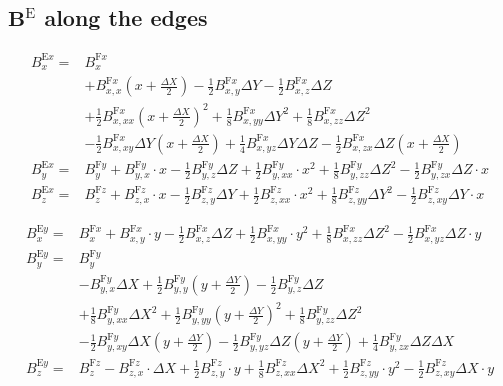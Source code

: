 \documentclass[a4paper,10pt]{article}
\newcommand{\Be}{\mathbf{B}^\mathrm{E}}
\newcommand{\Bex}{B^{\mathrm{E}x}}
\newcommand{\Bey}{B^{\mathrm{E}y}}
\newcommand{\Bfx}{B^{\mathrm{F}x}}
\newcommand{\Bfy}{B^{\mathrm{F}y}}
\newcommand{\Bfz}{B^{\mathrm{F}z}}
\newcommand{\pp}[1]{\left(#1\right)}
\newcommand{\DX}{\Delta X}
\newcommand{\DY}{\Delta Y}
\newcommand{\DZ}{\Delta Z}
\begin{document}
\subsection{$\Be$ along the edges}
\begin{align}
\Bex_x = &\Bfx_x \nonumber
\\ &+
\Bfx_{x,x}\pp{x + \frac{\DX}{2}} -
\frac{1}{2}\Bfx_{x,y}\DY -
\frac{1}{2}\Bfx_{x,z}\DZ \nonumber
\\ &+
\frac{1}{2}\Bfx_{x,xx}\pp{x+\frac{\DX}{2}}^2 +
\frac{1}{8}\Bfx_{x,yy}\DY^2 +
\frac{1}{8}\Bfx_{x,zz}\DZ^2 \nonumber
\\ &-
\frac{1}{2}\Bfx_{x,xy}\DY\pp{x + \frac{\DX}{2}} +
\frac{1}{4}\Bfx_{x,yz}\DY\DZ -
\frac{1}{2}\Bfx_{x,zx}\DZ\pp{x + \frac{\DX}{2}}
\\
\Bex_y =& \Bfy_y +
\Bfy_{y,x}\cdot x -
\frac{1}{2}\Bfy_{y,z}\DZ +
\frac{1}{2}\Bfy_{y,xx}\cdot x^2 +
\frac{1}{8}\Bfy_{y,zz}\DZ^2 -
\frac{1}{2}\Bfy_{y,zx}\DZ\cdot x
\\
\Bex_z =& \Bfz_z +
\Bfz_{z,x}\cdot x -
\frac{1}{2}\Bfz_{z,y}\DY +
\frac{1}{2}\Bfz_{z,xx}\cdot x^2 +
\frac{1}{8}\Bfz_{z,yy}\DY^2 -
\frac{1}{2}\Bfz_{z,xy}\DY\cdot x
\end{align}






\begin{align}
\Bey_x =& \Bfx_x +
\Bfx_{x,y}\cdot y -
\frac{1}{2}\Bfx_{x,z}\DZ +
\frac{1}{2}\Bfx_{x,yy}\cdot y^2 +
\frac{1}{8}\Bfx_{x,zz}\DZ^2 -
\frac{1}{2}\Bfx_{x,yz}\DZ\cdot y
\\
\Bey_y = &\Bfy_y \nonumber
\\ &-
\Bfy_{y,x}\DX +
\frac{1}{2}\Bfy_{y,y}\pp{y + \frac{\DY}{2}} -
\frac{1}{2}\Bfy_{y,z}\DZ \nonumber
\\ &+
\frac{1}{8}\Bfy_{y,xx}\DX^2 +
\frac{1}{2}\Bfy_{y,yy}\pp{y+\frac{\DY}{2}}^2 +
\frac{1}{8}\Bfy_{y,zz}\DZ^2 \nonumber
\\ &-
\frac{1}{2}\Bfy_{y,xy}\DX\pp{y + \frac{\DY}{2}} -
\frac{1}{2}\Bfy_{y,yz}\DZ\pp{y + \frac{\DY}{2}} +
\frac{1}{4}\Bfy_{y,zx}\DZ\DX
\\
\Bey_z =& \Bfz_z -
\Bfz_{z,x}\cdot\DX +
\frac{1}{2}\Bfz_{z,y}\cdot y +
\frac{1}{8}\Bfz_{z,xx}\DX^2 +
\frac{1}{2}\Bfz_{z,yy}\cdot y^2 -
\frac{1}{2}\Bfz_{z,xy}\DX\cdot y
\end{align}
\end{document}
